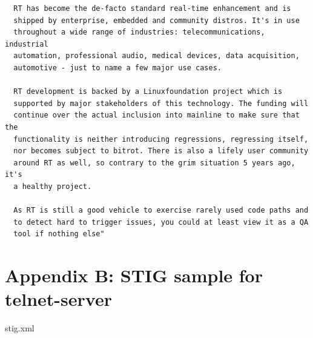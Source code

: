 \documentclass[12pt]{article}
\begin{document}
\begin{verbatim}
  RT has become the de-facto standard real-time enhancement and is
  shipped by enterprise, embedded and community distros. It's in use
  throughout a wide range of industries: telecommunications, industrial
  automation, professional audio, medical devices, data acquisition,
  automotive - just to name a few major use cases.

  RT development is backed by a Linuxfoundation project which is
  supported by major stakeholders of this technology. The funding will
  continue over the actual inclusion into mainline to make sure that the
  functionality is neither introducing regressions, regressing itself,
  nor becomes subject to bitrot. There is also a lifely user community
  around RT as well, so contrary to the grim situation 5 years ago, it's
  a healthy project.

  As RT is still a good vehicle to exercise rarely used code paths and
  to detect hard to trigger issues, you could at least view it as a QA
  tool if nothing else"
\end{verbatim}


%
\newpage
\section{Appendix B: STIG sample for telnet-server}

\lstset{
    language=xml,
    basicstyle=\footnotesize\ttfamily,
    linewidth=7.6in,
    frame=single,
    showstringspaces=false
}
\begin{adjustwidth}{-0.5in}{0.0in}
\begin{lstinputlisting}[caption={STIG XML sample},
label={lst:stig_xml}]{stig.xml}
\end{lstinputlisting}
\end{adjustwidth}
\vspace{0.8cm}


\end{document}
